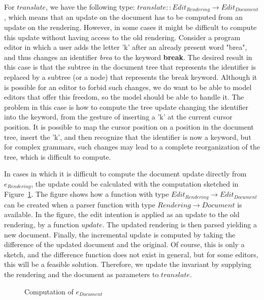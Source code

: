 \documentclass[twoside,epsf]{report}
\begin{document}
For $translate$, we have the following type: $translate :: Edit_{Rendering} \rightarrow Edit_{Document}$, which means that an update on the document has to be computed from an update on the rendering. However, in some cases it might be difficult to compute this update without having access to the old rendering. Consider a program editor in which a user adds the letter 'k' after an already present word "brea", and thus changes an identifier {\em brea} to the keyword {\bf break}. The desired result in this case is that the subtree in the document tree that represents the identifier is replaced by a subtree (or a node) that represents the break keyword. Although it is possible for an editor to forbid such changes, we do want to be able to model editors that offer this freedom, so the model should be able to handle it. The problem in this case is how to compute the tree update changing the identifier into the keyword, from the gesture of inserting a 'k' at the current cursor position. It is possible to map the cursor position on a position in the document tree, insert the 'k', and then recognize that the identifier is now a keyword, but for complex grammars, such changes may lead to a complete reorganization of the tree, which is difficult to compute.

In cases in which it is difficult to compute the document update directly from $e_{Rendering}$, the update could be calculated with the computation sketched in Figure~\ref{computeintentions}. The figure shows how a function with type $Edit_{Rendering} \rightarrow Edit_{Document}$ can be created when a parser function with type $Rendering \rightarrow Document$ is available. In the figure, the edit intention is applied as an update to the old rendering, by a function $update$. The updated rendering is then parsed yielding a new document. Finally, the incremental update is computed by taking the difference of the updated document and the original. Of course, this is only a sketch, and the difference function does not exist in general, but for some editors, this will be a feasible solution. Therefore, we update the invariant by supplying the rendering and the document as parameters to $translate$.
\begin{figure}
\begin{small}
\begin{center}
\begin{center}
\begin{small}
\bigskip \noindent
{}
\end{small}
\end{center}\caption{Computation of $e_{Document}$ }\label{computeintentions} 
\end{center}
\end{small}
\end{figure}
\end{document}
